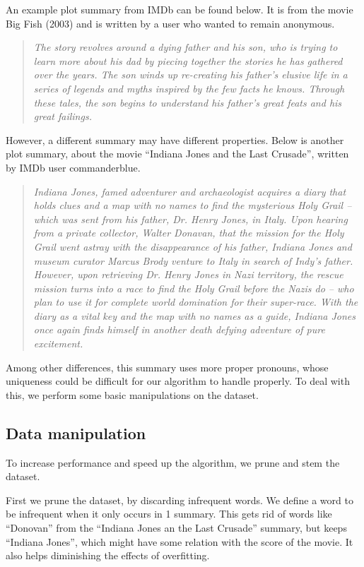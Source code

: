 \documentclass{article} %
\begin{document}
An example plot summary from IMDb can be found below. 
It is from the movie Big Fish (2003) and is written by a user who wanted to remain anonymous.
\begin{quotation}
  \emph{The story revolves around a dying father and his son, who is trying to learn more about his dad by piecing together the stories he has gathered over the years.
  The son winds up re-creating his father's elusive life in a series of legends and myths inspired by the few facts he knows.
  Through these tales, the son begins to understand his father's great feats and his great failings.}
\end{quotation}

However, a different summary may have different properties.
Below is another plot summary, about the movie ``Indiana Jones and the Last Crusade'', written by IMDb user commanderblue.
\begin{quotation}
  \emph{Indiana Jones, famed adventurer and archaeologist acquires a diary that holds clues and a map with no names to find the mysterious Holy Grail -- which was sent from his father, Dr. Henry Jones, in Italy. 
  Upon hearing from a private collector, Walter Donavan, that the mission for the Holy Grail went astray with the disappearance of his father, Indiana Jones and museum curator Marcus Brody venture to Italy in search of Indy's father. 
  However, upon retrieving Dr. Henry Jones in Nazi territory, the rescue mission turns into a race to find the Holy Grail before the Nazis do -- who plan to use it for complete world domination for their super-race. 
  With the diary as a vital key and the map with no names as a guide, Indiana Jones once again finds himself in another death defying adventure of pure excitement.}
\end{quotation}

Among other differences, this summary uses more proper pronouns, whose uniqueness could be difficult for our algorithm to handle properly.
To deal with this, we perform some basic manipulations on the dataset.

\subsection{Data manipulation}
To increase performance and speed up the algorithm, we prune and stem the dataset.

First we prune the dataset, by discarding infrequent words. 
We define a word to be infrequent when it only occurs in 1 summary. 
This gets rid of words like ``Donovan'' from the ``Indiana Jones an the Last Crusade'' summary, but keeps ``Indiana Jones'', which might have some relation with the score of the movie. It also helps diminishing the effects of overfitting.
\end{document}
